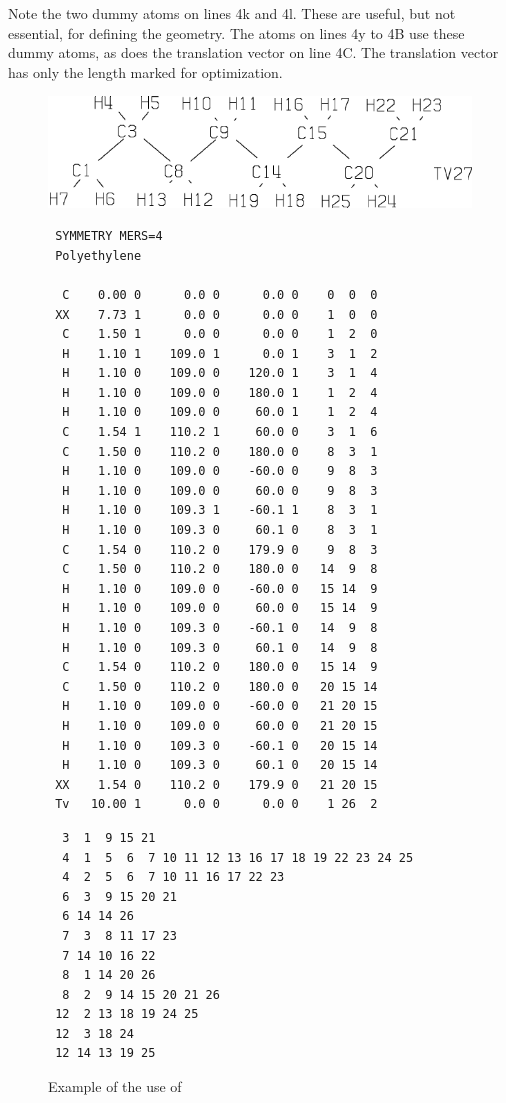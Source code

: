 Note the two dummy atoms on lines 4k and 4l.  These are useful, but not
essential, for defining the geometry.  The atoms on lines 4y to 4B use these
dummy atoms, as does the translation vector on  line 4C.    The  translation 
vector  has  only  the  length  marked  for optimization.

\begin{figure}
\begin{makeimage}
\end{makeimage}
\begin{center}
\includegraphics{picpolyc2h4}
\end{center}
\compresstable
\begin{verbatim}
 SYMMETRY MERS=4
 Polyethylene

  C    0.00 0      0.0 0      0.0 0    0  0  0
 XX    7.73 1      0.0 0      0.0 0    1  0  0
  C    1.50 1      0.0 0      0.0 0    1  2  0
  H    1.10 1    109.0 1      0.0 1    3  1  2
  H    1.10 0    109.0 0    120.0 1    3  1  4
  H    1.10 0    109.0 0    180.0 1    1  2  4
  H    1.10 0    109.0 0     60.0 1    1  2  4
  C    1.54 1    110.2 1     60.0 0    3  1  6
  C    1.50 0    110.2 0    180.0 0    8  3  1
  H    1.10 0    109.0 0    -60.0 0    9  8  3
  H    1.10 0    109.0 0     60.0 0    9  8  3
  H    1.10 0    109.3 1    -60.1 1    8  3  1
  H    1.10 0    109.3 0     60.1 0    8  3  1
  C    1.54 0    110.2 0    179.9 0    9  8  3
  C    1.50 0    110.2 0    180.0 0   14  9  8
  H    1.10 0    109.0 0    -60.0 0   15 14  9
  H    1.10 0    109.0 0     60.0 0   15 14  9
  H    1.10 0    109.3 0    -60.1 0   14  9  8
  H    1.10 0    109.3 0     60.1 0   14  9  8
  C    1.54 0    110.2 0    180.0 0   15 14  9
  C    1.50 0    110.2 0    180.0 0   20 15 14
  H    1.10 0    109.0 0    -60.0 0   21 20 15
  H    1.10 0    109.0 0     60.0 0   21 20 15
  H    1.10 0    109.3 0    -60.1 0   20 15 14
  H    1.10 0    109.3 0     60.1 0   20 15 14
 XX    1.54 0    110.2 0    179.9 0   21 20 15
 Tv   10.00 1      0.0 0      0.0 0    1 26  2
\end{verbatim}

\begin{verbatim}
  3  1  9 15 21
  4  1  5  6  7 10 11 12 13 16 17 18 19 22 23 24 25
  4  2  5  6  7 10 11 16 17 22 23
  6  3  9 15 20 21
  6 14 14 26
  7  3  8 11 17 23
  7 14 10 16 22
  8  1 14 20 26
  8  2  9 14 15 20 21 26
 12  2 13 18 19 24 25
 12  3 18 24
 12 14 13 19 25
\end{verbatim}
\caption{\label{polyc2h4}Example of the use of }
\end{figure}

